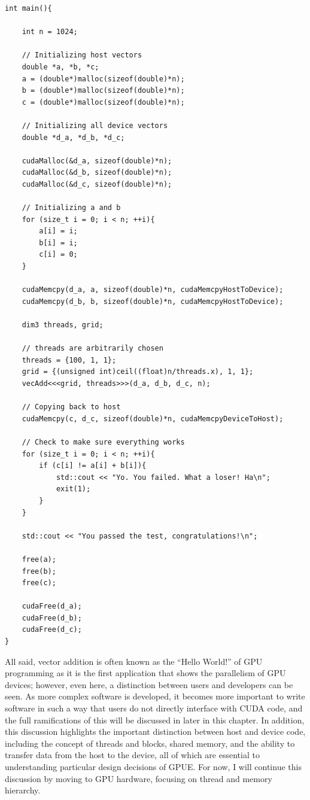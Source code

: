 \begin{lstlisting}[float,label=lst:vecaddhost, style=c++,caption={An example of host code to run Listing~\ref{lst:vecaddCUDA2}.}]
int main(){

    int n = 1024;

    // Initializing host vectors
    double *a, *b, *c;
    a = (double*)malloc(sizeof(double)*n);
    b = (double*)malloc(sizeof(double)*n);
    c = (double*)malloc(sizeof(double)*n);

    // Initializing all device vectors
    double *d_a, *d_b, *d_c;

    cudaMalloc(&d_a, sizeof(double)*n);
    cudaMalloc(&d_b, sizeof(double)*n);
    cudaMalloc(&d_c, sizeof(double)*n);

    // Initializing a and b
    for (size_t i = 0; i < n; ++i){
        a[i] = i;
        b[i] = i;
        c[i] = 0;
    }

    cudaMemcpy(d_a, a, sizeof(double)*n, cudaMemcpyHostToDevice);
    cudaMemcpy(d_b, b, sizeof(double)*n, cudaMemcpyHostToDevice);

    dim3 threads, grid;

    // threads are arbitrarily chosen
    threads = {100, 1, 1};
    grid = {(unsigned int)ceil((float)n/threads.x), 1, 1};
    vecAdd<<<grid, threads>>>(d_a, d_b, d_c, n);

    // Copying back to host
    cudaMemcpy(c, d_c, sizeof(double)*n, cudaMemcpyDeviceToHost);

    // Check to make sure everything works
    for (size_t i = 0; i < n; ++i){
        if (c[i] != a[i] + b[i]){
            std::cout << "Yo. You failed. What a loser! Ha\n";
            exit(1);
        }
    }

    std::cout << "You passed the test, congratulations!\n";

    free(a);
    free(b);
    free(c);

    cudaFree(d_a);
    cudaFree(d_b);
    cudaFree(d_c);
}
\end{lstlisting}

All said, vector addition is often known as the ``Hello World!'' of GPU programming as it is the first application that shows the parallelism of GPU devices; however, even here, a distinction between users and developers can be seen.
As more complex software is developed, it becomes more important to write software in such a way that users do not directly interface with CUDA code, and the full ramifications of this will be discussed in later in this chapter.
In addition, this discussion highlights the important distinction between host and device code, including the concept of threads and blocks, shared memory, and the ability to transfer data from the host to the device, all of which are essential to understanding particular design decisions of GPUE.
For now, I will continue this discussion by moving to GPU hardware, focusing on thread and memory hierarchy.

